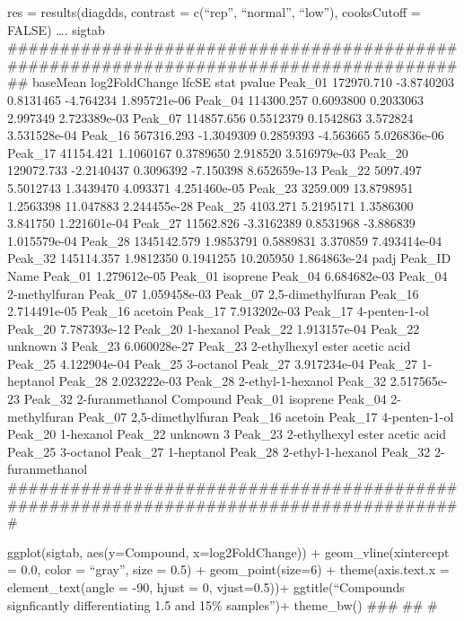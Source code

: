 \documentclass[]{article}
\begin{document}
res = results(diagdds, contrast = c(``rep'', ``normal'', ``low''),
cooksCutoff = FALSE) \ldots{}. sigtab
\#\#\#\#\#\#\#\#\#\#\#\#\#\#\#\#\#\#\#\#\#\#\#\#\#\#\#\#\#\#\#\#\#\#\#\#\#\#\#\#\#\#\#\#\#\#\#\#\#\#\#\#\#\#\#\#\#\#\#\#\#\#\#\#\#\#\#\#\#\#\#\#\#\#\#\#\#\#\#\#\#\#\#\#\#\#\#\#
baseMean log2FoldChange lfcSE stat pvalue Peak\_01 172970.710 -3.8740203
0.8131465 -4.764234 1.895721e-06 Peak\_04 114300.257 0.6093800 0.2033063
2.997349 2.723389e-03 Peak\_07 114857.656 0.5512379 0.1542863 3.572824
3.531528e-04 Peak\_16 567316.293 -1.3049309 0.2859393 -4.563665
5.026836e-06 Peak\_17 41154.421 1.1060167 0.3789650 2.918520
3.516979e-03 Peak\_20 129072.733 -2.2140437 0.3096392 -7.150398
8.652659e-13 Peak\_22 5097.497 5.5012743 1.3439470 4.093371 4.251460e-05
Peak\_23 3259.009 13.8798951 1.2563398 11.047883 2.244455e-28 Peak\_25
4103.271 5.2195171 1.3586300 3.841750 1.221601e-04 Peak\_27 11562.826
-3.3162389 0.8531968 -3.886839 1.015579e-04 Peak\_28 1345142.579
1.9853791 0.5889831 3.370859 7.493414e-04 Peak\_32 145114.357 1.9812350
0.1941255 10.205950 1.864863e-24 padj Peak\_ID Name Peak\_01
1.279612e-05 Peak\_01 isoprene Peak\_04 6.684682e-03 Peak\_04
2-methylfuran Peak\_07 1.059458e-03 Peak\_07 2,5-dimethylfuran Peak\_16
2.714491e-05 Peak\_16 acetoin Peak\_17 7.913202e-03 Peak\_17
4-penten-1-ol Peak\_20 7.787393e-12 Peak\_20 1-hexanol Peak\_22
1.913157e-04 Peak\_22 unknown 3 Peak\_23 6.060028e-27 Peak\_23
2-ethylhexyl ester acetic acid Peak\_25 4.122904e-04 Peak\_25 3-octanol
Peak\_27 3.917234e-04 Peak\_27 1-heptanol Peak\_28 2.023222e-03 Peak\_28
2-ethyl-1-hexanol Peak\_32 2.517565e-23 Peak\_32 2-furanmethanol
Compound Peak\_01 isoprene Peak\_04 2-methylfuran Peak\_07
2,5-dimethylfuran Peak\_16 acetoin Peak\_17 4-penten-1-ol Peak\_20
1-hexanol Peak\_22 unknown 3 Peak\_23 2-ethylhexyl ester acetic acid
Peak\_25 3-octanol Peak\_27 1-heptanol Peak\_28 2-ethyl-1-hexanol
Peak\_32 2-furanmethanol
\#\#\#\#\#\#\#\#\#\#\#\#\#\#\#\#\#\#\#\#\#\#\#\#\#\#\#\#\#\#\#\#\#\#\#\#\#\#\#\#\#\#\#\#\#\#\#\#\#\#\#\#\#\#\#\#\#\#\#\#\#\#\#\#\#\#\#\#\#\#\#\#\#\#\#\#\#\#\#\#\#\#\#\#\#\#\#

ggplot(sigtab, aes(y=Compound, x=log2FoldChange)) +
geom\_vline(xintercept = 0.0, color = ``gray'', size = 0.5) +
geom\_point(size=6) + theme(axis.text.x = element\_text(angle = -90,
hjust = 0, vjust=0.5))+ ggtitle(``Compounds signficantly differentiating
1.5 and 15\% samples'')+ theme\_bw() \#\#\# \#\# \#

\section{}\label{section-23}
\end{document}
